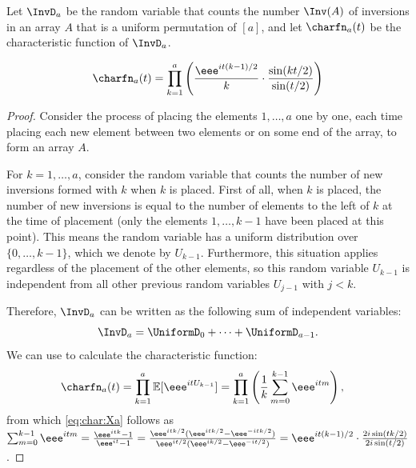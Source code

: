 Let $\InvD_a$ be the random variable that counts the number $\Inv(A)$ of inversions in an array $A$ that is a uniform permutation of $[a]$, and let $\charfn_a(t)$ be the characteristic function of $\InvD_a$.
\begin{claim}
    \label{claim:inversion-charfn}
    \begin{align}\label{eq:char:Xa}
    \charfn_a(t)=\prod_{k=1}^{a}\left(\frac{\eee^{it(k-1)/2}}{k}\cdot\frac{\sin(kt/2)}{\sin(t/2)}\right) 
    \end{align}
\end{claim}
\begin{proof}
Consider the process of placing the elements $1,\dots,a$ one by one, each time placing each new element between two elements or on some end of the array, to form an array $A$. 

For $k=1,\dots,a$, consider the random variable that counts the number of new inversions formed with $k$ when $k$ is placed. First of all, when $k$ is placed, the number of new inversions is equal to the number of elements to the left of $k$ at the time of placement (only the elements $1,\dots,k-1$ have been placed at this point). This means the random variable has a uniform distribution over $\{0,\dots,k-1\}$, which we denote by $U_{k-1}$. Furthermore, this situation applies regardless of the placement of the other elements, so this random variable $U_{k-1}$ is independent from all other previous random variables $U_{j-1}$ with $j<k$. 

Therefore, $\InvD_a$ can be written as the following sum of independent variables:
\[\InvD_a = \UniformD_0 + \dots + \UniformD_{a-1}. \]
We can use  to calculate the characteristic function:
\begin{align*}
\charfn_a(t)&=\prod_{k=1}^{a} \mathbb{E}[\eee^{itU_{k-1}}]=\prod_{k=1}^{a}\left(\frac{1}{k}\sum_{m=0}^{k-1} \eee^{itm}\right),
\end{align*}
from which \eqref{eq:char:Xa} follows as
$\sum_{m=0}^{k-1} \eee^{itm} 
= \frac{\eee^{itk}-1}{\eee^{it}-1} 
= \frac{\eee^{itk/2}(\eee^{itk/2}-\eee^{-itk/2})}{\eee^{it/2}(\eee^{ik/2}-\eee^{-it/2})} 
= \eee^{it(k-1)/2} \cdot \frac{2i\sin(tk/2)}{2i\sin(t/2)}$.
\end{proof}

